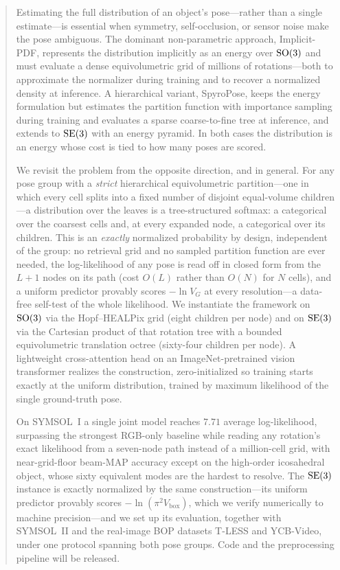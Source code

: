 \begin{abstract}
Estimating the full distribution of an object's pose---rather than a single
estimate---is essential when symmetry, self-occlusion, or sensor noise make the
pose ambiguous. The dominant non-parametric approach, Implicit-PDF, represents
the distribution implicitly as an energy over $\SOthree$ and must evaluate a
dense equivolumetric grid of millions of rotations---both to approximate the
normalizer during training and to recover a normalized density at inference.
A hierarchical variant, SpyroPose, keeps the energy formulation but estimates
the partition function with importance sampling during training and evaluates a
sparse coarse-to-fine tree at inference, and extends to $\SEthree$ with an energy
pyramid. In both cases the distribution is an energy whose cost is tied to how many
poses are scored.

We revisit the problem from the opposite direction, and in general. For any pose
group with a \emph{strict} hierarchical equivolumetric partition---one in which
every cell splits into a fixed number of disjoint equal-volume children---a
distribution over the leaves is a tree-structured softmax: a categorical over the
coarsest cells and, at every expanded node, a categorical over its children. This
is an \emph{exactly} normalized probability by design, independent of the group: no
retrieval grid and no sampled partition function are ever needed, the log-likelihood
of any pose is read off in closed form from the $L{+}1$ nodes on its path (cost
$O(L)$ rather than $O(N)$ for $N$ cells), and a uniform predictor provably scores
$-\ln V_G$ at every resolution---a data-free self-test of the whole likelihood. We
instantiate the framework on $\SOthree$ via the Hopf--HEALPix grid (eight children
per node) and on $\SEthree$ via the Cartesian product of that rotation tree with a
bounded equivolumetric translation octree (sixty-four children per node). A
lightweight cross-attention head on an ImageNet-pretrained vision transformer
realizes the construction, zero-initialized so training starts exactly at the
uniform distribution, trained by maximum likelihood of the single ground-truth pose.

On SYMSOL~I a single joint model reaches $7.71$ average log-likelihood, surpassing
the strongest RGB-only baseline while reading any rotation's exact likelihood from a
seven-node path instead of a million-cell grid, with near-grid-floor beam-MAP
accuracy except on the high-order icosahedral object, whose sixty equivalent modes
are the hardest to resolve. The $\SEthree$ instance is exactly normalized by the
same construction---its uniform predictor provably scores $-\ln(\pi^2 V_{\mathrm{box}})$,
which we verify numerically to machine precision---and we set up its evaluation,
together with SYMSOL~II and the real-image BOP datasets T-LESS and YCB-Video, under
one protocol spanning both pose groups. Code and the preprocessing pipeline will be
released.
\end{abstract}

